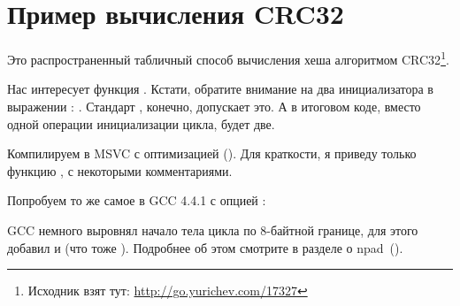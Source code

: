 \section{Пример вычисления CRC32}
\label{sec:CRC32}

\newcommand{\URLCRCSRC}{\url{http://go.yurichev.com/17327}}

Это распространенный табличный способ вычисления хеша алгоритмом 
CRC32\footnote{Исходник взят тут: \URLCRCSRC}.



Нас интересует функция . 
Кстати, обратите внимание на два инициализатора в выражении : . 
Стандарт \CCpp, конечно, допускает это. А в итоговом коде, вместо одной операции инициализации цикла, будет две.

Компилируем в MSVC с оптимизацией (\Ox). 
Для краткости, я приведу только функцию , с некоторыми комментариями.



Попробуем то же самое в GCC 4.4.1 с опцией \Othree:



GCC немного выровнял начало тела цикла по 8-байтной границе, для этого добавил 
\NOP и  (что тоже ). 
Подробнее об этом смотрите в разделе о npad~().

